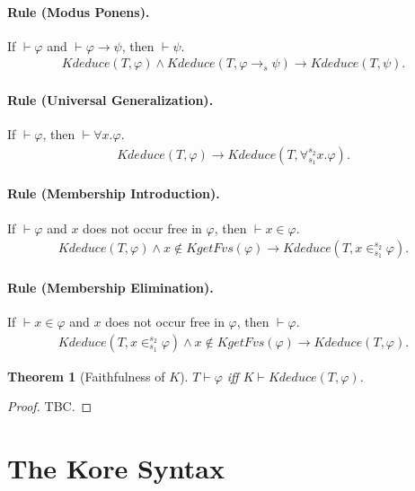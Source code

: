 \documentclass[UTF8]{article}
\newcounter{thmcounter}
\theoremstyle{plain}
\newtheorem{theorem}[thmcounter]{Theorem}
\theoremstyle{definition}
\theoremstyle{remark}
\newcommand{\kimplies}{\to}
\newcommand{\kforall}{\forall}
\newcommand{\kin}{\in}
\newcommand{\KgetFvs}{\mathit{KgetFvs}}
\newcommand{\Kdeduce}{\mathit{Kdeduce}}
\begin{document}
\paragraph{Rule (Modus Ponens).}
If $\vdash \varphi$ and $\vdash \varphi \to \psi$, then $\vdash \psi$.
\begin{align*}
\Kdeduce(T, \varphi) \wedge \Kdeduce(T, \varphi \kimplies_s \psi) \to 
\Kdeduce(T, \psi).
\end{align*}

\paragraph{Rule (Universal Generalization).}
If $\vdash \varphi$, then $\vdash \forall x . \varphi$.
\begin{align*}
\Kdeduce(T, \varphi) \to \Kdeduce(T, \kforall_{s_1}^{s_2} x . \varphi).
\end{align*}

\paragraph{Rule (Membership Introduction).}
If $\vdash \varphi$ and $x$ does not occur free in $\varphi$, then $\vdash x \in \varphi$.
\begin{align*}
\Kdeduce(T, \varphi) \wedge x \not\in \KgetFvs(\varphi) \to \Kdeduce(T, x 
\kin_{s_1}^{s_2} \varphi).
\end{align*}

\paragraph{Rule (Membership Elimination).}
If $\vdash x \in \varphi$ and $x$ does not occur free in $\varphi$, then $\vdash \varphi$.
\begin{align*}
\Kdeduce(T, x \kin_{s_1}^{s_2} \varphi) \wedge x \not\in \KgetFvs(\varphi) \to 
\Kdeduce(T, \varphi).
\end{align*}

\begin{theorem}[Faithfulness of $K$]
	$T \vdash \varphi$ iff $K \vdash \Kdeduce(T, \varphi)$.
\end{theorem}
\begin{proof}
	TBC.
\end{proof}

\section{The Kore Syntax}
\end{document}
